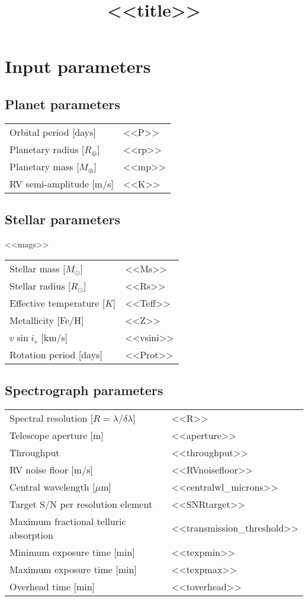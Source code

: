 \documentclass[a4paper]{article}
\title{\textbf{<<title>>}}
\begin{document}
\maketitle

\section{Input parameters}
\subsection{Planet parameters}
\begin{tabular}{ll}
  Orbital period [days] & <<P>> \\
  Planetary radius [$R_{\oplus}$] & <<rp>> \\
  Planetary mass [$M_{\oplus}$] & <<mp>> \\
  RV semi-amplitude [m/s] & <<K>>
\end{tabular}

\subsection{Stellar parameters}
<<mags>> \\

\noindent
\begin{tabular}{ll}
  Stellar mass [$M_{\odot}$] & <<Ms>> \\  
  Stellar radius [$R_{\odot}$] & <<Rs>> \\
  Effective temperature [$K$] & <<Teff>> \\
  Metallicity [Fe/H] & <<Z>> \\
  $v\sin{i_s}$ [km/s] & <<vsini>> \\
  Rotation period [days] & <<Prot>>
\end{tabular}

\subsection{Spectrograph parameters}
\begin{tabular}{ll}
  Spectral resolution [$R = \lambda / \delta \lambda$] & <<R>> \\
  Telescope aperture [m] & <<aperture>> \\
  Throughput & <<throughput>> \\
  RV noise floor [m/s] & <<RVnoisefloor>> \\
  Central wavelength [$\mu$m] & <<centralwl_microns>> \\ 
  Target S/N per resolution element & <<SNRtarget>> \\
  Maximum fractional telluric absorption & <<transmission_threshold>> \\
  Minimum exposure time [min] & <<texpmin>> \\
  Maximum exposure time [min] & <<texpmax>> \\
  Overhead time [min] & <<toverhead>> \\
\end{tabular}
\end{document}
